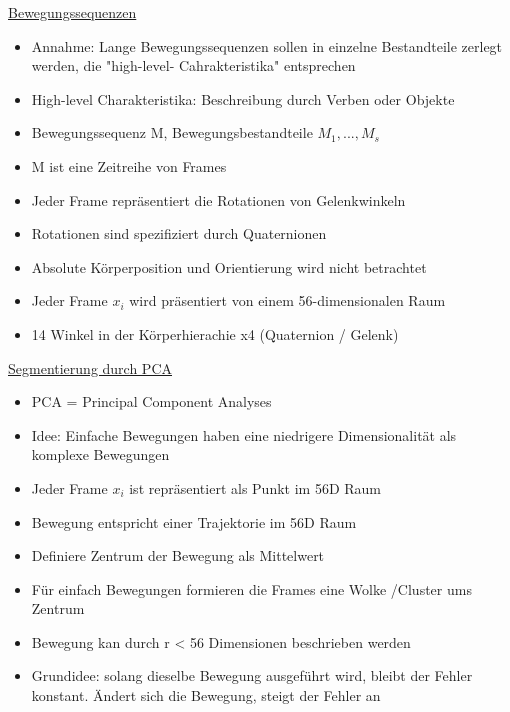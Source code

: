 \documentclass[a4paper,10pt,oneside]{article}
\begin{document}
\underline{Bewegungssequenzen} \\
 	\begin{itemize}
 		\item Annahme: Lange Bewegungssequenzen sollen in einzelne Bestandteile zerlegt werden, die "high-level- Cahrakteristika" entsprechen
 		\item High-level Charakteristika: Beschreibung durch Verben oder Objekte
 		\item Bewegungssequenz M, Bewegungsbestandteile $M_1, ...,M_s$
 		\item M ist eine Zeitreihe von Frames 
 		\item Jeder Frame repräsentiert die Rotationen von Gelenkwinkeln 
 		\item Rotationen sind spezifiziert durch Quaternionen
 		\item Absolute Körperposition und Orientierung wird nicht betrachtet
 		\item Jeder Frame $x_i$ wird präsentiert von einem 56-dimensionalen Raum
 		\item 14 Winkel in der Körperhierachie x4 (Quaternion / Gelenk)
 	\end{itemize}

\underline{Segmentierung durch PCA} \\
 	\begin{itemize}
 		\item PCA = Principal Component Analyses 
 		\item Idee: Einfache Bewegungen haben eine niedrigere Dimensionalität als komplexe Bewegungen 
 		\item Jeder Frame $x_i$ ist repräsentiert als Punkt im 56D Raum
 		\item Bewegung entspricht einer Trajektorie im 56D Raum
 		\item Definiere Zentrum der Bewegung als Mittelwert
 		\item Für einfach Bewegungen formieren die Frames eine Wolke /Cluster ums Zentrum
 		\item Bewegung kan durch r < 56 Dimensionen beschrieben werden
 		\item Grundidee: solang dieselbe Bewegung ausgeführt wird, bleibt der Fehler konstant. Ändert sich die Bewegung, steigt der Fehler an
 	\end{itemize}
 		
\end{document}
